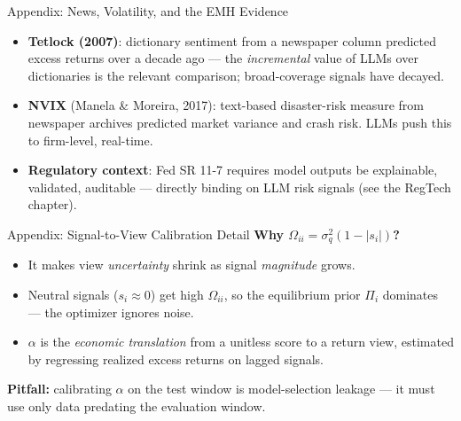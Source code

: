 \documentclass[9pt,t]{beamer}
\begin{document}
\begin{frame}[noframenumbering]{Appendix: News, Volatility, and the EMH Evidence}
\begin{itemize}
  \item \textbf{Tetlock (2007)}: dictionary sentiment from a newspaper column predicted
        excess returns over a decade ago --- the \emph{incremental} value of LLMs over
        dictionaries is the relevant comparison; broad-coverage signals have decayed.
  \item \textbf{NVIX} (Manela \& Moreira, 2017): text-based disaster-risk measure from
        newspaper archives predicted market variance and crash risk. LLMs push this to
        firm-level, real-time.
  \item \textbf{Regulatory context}: Fed SR 11-7 requires model outputs be explainable,
        validated, auditable --- directly binding on LLM risk signals (see the RegTech chapter).
\end{itemize}
\end{frame}

\begin{frame}[noframenumbering]{Appendix: Signal-to-View Calibration Detail}
\textbf{Why $\Omega_{ii}=\sigma_q^2(1-|s_i|)$?}
\begin{itemize}
  \item It makes view \emph{uncertainty} shrink as signal \emph{magnitude} grows.
  \item Neutral signals ($s_i\approx 0$) get high $\Omega_{ii}$, so the equilibrium prior
        $\Pi_i$ dominates --- the optimizer ignores noise.
  \item $\alpha$ is the \emph{economic translation} from a unitless score to a return view,
        estimated by regressing realized excess returns on lagged signals.
\end{itemize}
\medskip
\textbf{Pitfall:} calibrating $\alpha$ on the test window is model-selection leakage ---
it must use only data predating the evaluation window.
\end{frame}
\end{document}

